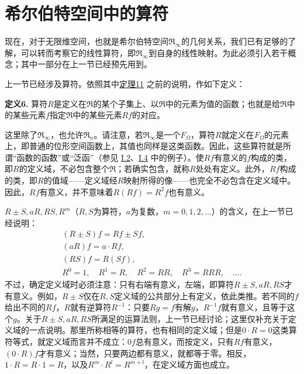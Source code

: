 \documentclass[fontsize=13pt,twoside,openany,headings=normal,parskip=false,bookmarkpackage=false,DIV=calc]{scrbook}
\begin{document}
\section{希尔伯特空间中的算符}\label{sec:II.5}
现在，对于无限维空间，也就是希尔伯特空间$\mathfrak{R}_\infty$的几何关系，我们已有足够的了解，可以转而考察它的线性算符，即$\mathfrak{R}_\infty$到自身的线性映射。为此必须引入若干概念；其中一部分在上一节已经预先用到。

上一节已经涉及算符。依照其中\CJKglue \hyperref[thm:II.11]{定理11} 之前的说明，作如下定义：

\leavevmode{}\textbf{定义6.}\label{def:II.6} 算符$R$是定义在$\mathfrak{R}$的某个子集上、以$\mathfrak{R}$中的元素为值的函数；也就是给$\mathfrak{R}$中的某些元素$f$指定$\mathfrak{R}$中的某些元素$Rf$的对应。

这里除了$\mathfrak{R}_\infty$，也允许$\mathfrak{R}_n$。请注意，若$\mathfrak{R}_\infty$是一个$F_\Omega$，算符$R$就定义在$F_\Omega$的元素上，即普通的位形空间函数上，其值也同样是这类函数。因此，这些算符就是所谓“函数的函数”或“泛函”（参见 \hyperref[sec:I.2]{I.2}、\hyperref[sec:I.4]{I.4} 中的例子）。使$Rf$有意义的$f$构成的类，即$R$的定义域，不必包含整个$\mathfrak{R}$；若确实包含，就称$R$处处有定义。此外，$Rf$构成的类，即$R$的值域——定义域经$R$映射所得的像——也完全不必包含在定义域中。因此，$Rf$有意义，并不意味着$R(Rf)=R^2f$也有意义。

\hypertarget{origpage-47}{}\label{origpage-47}$R\pm S,\allowbreak aR,\allowbreak RS,\allowbreak R^m$（$R,\allowbreak S$为算符，$a$为复数，$m=0,\allowbreak 1,\allowbreak 2,\allowbreak \ldots$）的含义，在上一节已经说明：
\begin{gather*}
(R\pm S)f=Rf\pm Sf,\\
(aR)f=a\cdot Rf,\\
(RS)f=R(Sf),\\
R^0=1,\quad R^1=R,\quad R^2=RR,\quad R^3=RRR,\quad\ldots.
\end{gather*}
不过，确定定义域时必须注意：只有右端有意义，左端，即算符$R\pm S,\allowbreak aR,\allowbreak RS$才有意义。例如，$R\pm S$仅在$R,\allowbreak S$定义域的公共部分上有定义，依此类推。若不同的$f$给出不同的$Rf$，$R$就有逆算符$R^{-1}$：只要$Rg=f$有解$g$，$R^{-1}f$就有意义，且等于这个$g$。关于$R\pm S,\allowbreak aR,\allowbreak RS$所满足的运算法则，上一节已经讨论；这里仅补充关于定义域的一点说明。那里所称相等的算符，也有相同的定义域；但是$0\cdot R=0$这类算符等式，就定义域而言并不成立：$0f$总有意义，而按定义，只有$Rf$有意义，$(0\cdot R)f$才有意义；当然，只要两边都有意义，就都等于零。相反，$1\cdot R=R\cdot1=R$，以及$R^m\cdot R^l=R^{m+l}$，在定义域方面也成立。
\end{document}

